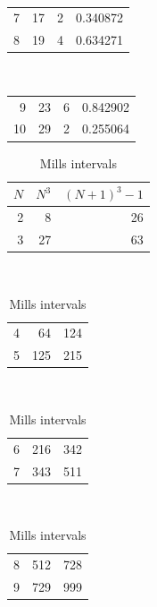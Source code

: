 \documentclass[11pt,reqno]{amsart}
\theoremstyle{blueplain}
\numberwithin{equation}{section}
\begin{document}
{\begin{table}[H]
\begin{tabular}{rrrr}
	\end{tabular}%
	\noindent \hspace{1em}\\[0pt]
	\noindent 
	\begin{tabular}{rrrr}
		7 & 17 & 2 & 0.340872 \\ 
		8 & 19 & 4 & 0.634271 \\ 
		
	\end{tabular}%
	\noindent \hspace{1em}\\[0pt]
	\noindent 
	\begin{tabular}{rrrr}
		9 & 23 & 6 & 0.842902 \\ 
		10 & 29 & 2 & 0.255064 \\ 
		\bottomrule 
	\end{tabular}
\end{table}
\text{\ } \newline
\text{\ } \vspace{0.3in}\text{\ }



\begin{table}[H]
	\centering
	\caption{Mills intervals}
	\begin{tabular}{rrr}
		\toprule $N$ & $N^{3}$ & \multicolumn{1}{r}{$(N+1)^{3}-1$} \\ 
		\midrule 2 & 8 & \multicolumn{1}{r}{26} \\ 
		3 & 27 & \multicolumn{1}{r}{63} \\ 
		
	\end{tabular}%
	\noindent \hspace{1em}\\[0pt]
	\noindent 
	\begin{tabular}{rrr}
		4 & 64 & \multicolumn{1}{r}{124} \\ 
		5 & 125 & \multicolumn{1}{r}{215} \\ 
		
	\end{tabular}%
	\noindent \hspace{1em}\\[0pt]
	\noindent 
	\begin{tabular}{rrr}
		6 & 216 & \multicolumn{1}{r}{342} \\ 
		7 & 343 & \multicolumn{1}{r}{511} \\ 
		
	\end{tabular}%
	\noindent \hspace{1em}\\[0pt]
	\noindent 
	\begin{tabular}{rrr}
		8 & 512 & \multicolumn{1}{r}{728} \\ 
		9 & 729 & \multicolumn{1}{r}{999} \\ 
		

\end{tabular}
\end{table}}
\end{document}

